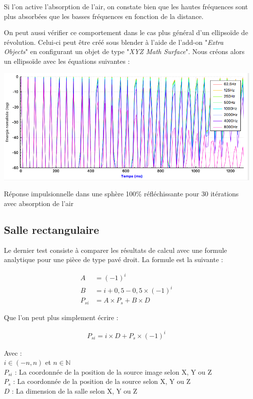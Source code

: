 Si l'on active l'absorption de l'air, on constate bien que les hautes fréquences sont plus absorbées que les basses fréquences en fonction de la distance.

On peut aussi vérifier ce comportement dans le cas plus général d'un ellipsoïde de révolution. Celui-ci peut être créé sous blender à l'aide de l'add-on "\textit{Extra Objects}" en configurant un objet de type "\textit{XYZ Math Surface}". Nous créons alors un ellipsoïde avec les équations suivantes :

\begin{figureth}
	\includegraphics[width=\linewidth]{images/test2absair}
	\caption{Réponse impulsionnelle dans une sphère 100\% réfléchissante pour 30 itérations avec absorption de l'air}
	\label{test2absair}
\end{figureth}

\subsection{Salle rectangulaire}

Le dernier test consiste à comparer les résultats de calcul avec une formule analytique pour une pièce de type pavé droit. La formule \cite[p. 182-189]{mcgovern} est la suivante : 

\begin{align}
A &=  (-1)^i \\
B &= i + 0,5 - 0,5 \times (-1)^i \\
P_{si} &= A \times P_s + B \times D
\end{align}

Que l'on peut plus simplement écrire :

\begin{align}
P_{si} = i \times D + P_s \times (-1)^i
\end{align}

Avec : \\
$i \in (-n, n)$ et $n \in \mathbb{N}$ \\
$P_{si}$ : La coordonnée de la position de la source image selon X, Y ou Z \\
$P_s$ : La coordonnée de la position de la source selon X, Y ou Z \\
$D$ : La dimension de la salle selon X, Y ou Z \\

